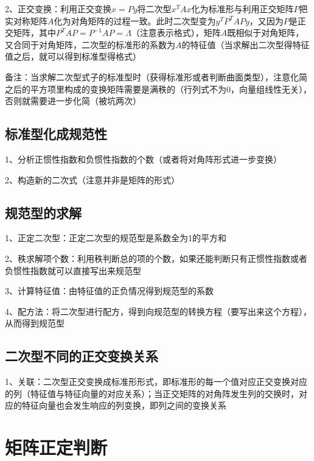 2、正交变换：利用正交变换$x=Py$将二次型$x^TAx$化为标准形与利用正交矩阵$P$把实对称矩阵$A$化为对角矩阵的过程一致。此时二次型变为$y^TP^TAPy$，又因为$P$是正交矩阵，其中$P^TAP =P^{-1}AP= \Lambda$（注意表示格式），矩阵$A$既相似于对角矩阵，又合同于对角矩阵，二次型的标准形的系数为$A$的特征值（当求解出二次型得特征值之后，就可以得到标准型得格式）

备注：当求解二次型式子的标准型时（获得标准形或者判断曲面类型），注意化简之后的平方项里构成的变换矩阵需要是满秩的（行列式不为0，向量组线性无关），否则就需要进一步化简（被坑两次）



\subsection{标准型化成规范性}

1、分析正惯性指数和负惯性指数的个数（或者将对角阵形式进一步变换）

2、构造新的二次式（注意并非是矩阵的形式）



\subsection{规范型的求解}

1、正定二次型：正定二次型的规范型是系数全为1的平方和

2、秩求解项个数：利用秩判断总的项的个数，如果还能判断只有正惯性指数或者负惯性指数就可以直接写出来规范型

3、计算特征值：由特征值的正负情况得到规范型的系数

4、配方法：将二次型进行配方，得到向规范型的转换方程（要写出来这个方程），从而得到规范型



\subsection{二次型不同的正交变换关系}

1、关联：二次型正交变换成标准形形式，即标准形的每一个值对应正交变换对应的列（特征值与特征向量的对应关系）；当正交矩阵的对角阵发生列的交换时，对应的特征向量也会发生响应的列变换，即列之间的变换关系

\section{矩阵正定判断}



